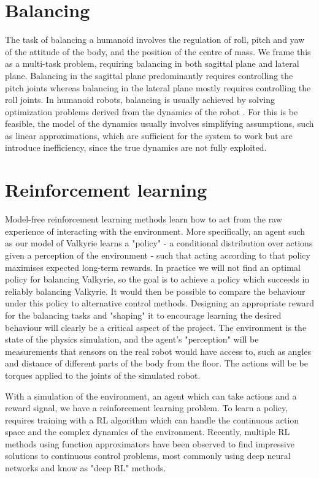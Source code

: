 \documentclass[a4paper]{article}
\begin{document}
\section{Balancing}
The task of balancing a humanoid involves the regulation of roll, pitch and yaw of the attitude of the body, and the position of the centre of mass. We frame this as a multi-task problem, requiring balancing in both sagittal plane and lateral plane. Balancing in the sagittal plane predominantly requires controlling the pitch joints whereas balancing in the lateral plane mostly requires controlling the roll joints. In humanoid robots, balancing is usually achieved by solving optimization problems derived from the dynamics of the robot \citep{pratt2006capture, kuindersma2016optimization}. For this is be feasible, the model of the dynamics usually involves simplifying assumptions, such as linear approximations, which are sufficient for the system to work but are introduce inefficiency, since the true dynamics are not fully exploited. 

\section{Reinforcement learning}
Model-free reinforcement learning methods learn how to act from the raw experience of interacting with the environment. 
More specifically, an agent such as our model of Valkyrie learns a "policy" - a conditional distribution over actions given a perception of the environment - such that acting according to that policy maximises expected long-term rewards.
In practice we will not find an optimal policy for balancing Valkyrie, so the goal is to achieve a policy which succeeds in reliably balancing Valkyrie.
It would then be possible to compare the behaviour under this policy to alternative control methods. 
Designing an appropriate reward for the balancing tasks and "shaping" it to encourage learning the desired behaviour will clearly be a critical aspect of the project. The environment is the state of the physics simulation, and the agent's "perception" will be measurements that sensors on the real robot would have access to, such as angles and distance of different parts of the body from the floor. The actions will be be torques applied to the joints of the simulated robot.

With a simulation of the environment, an agent which can take actions and a reward signal, we have a reinforcement learning problem. To learn a policy, requires training with a RL algorithm which can handle the continuous action space and the complex dynamics of the environment. Recently, multiple RL methods using function approximators have been observed to find impressive solutions to continuous control problems, most commonly using deep neural networks and know as "deep RL" methods.
\end{document}
